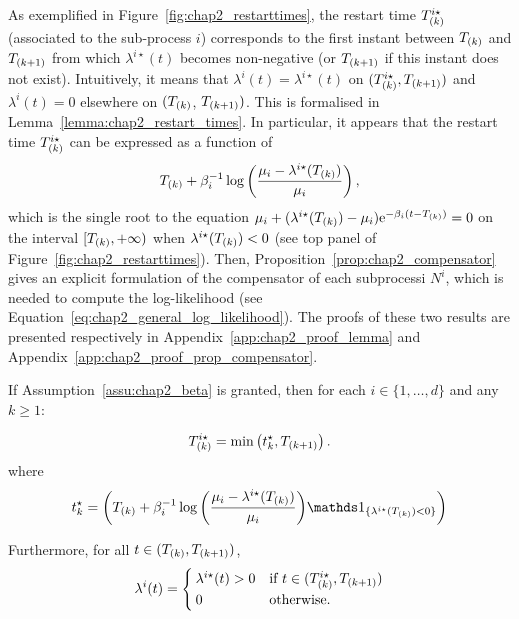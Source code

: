      As exemplified in Figure~\ref{fig:chap2_restarttimes}, the restart time $T\park^{i\star}$ (associated to the sub-process $i$) corresponds to the first instant between $T\park$ and $T\park[k+1]$ from which $\lambda^{i\star}(t)$ becomes non-negative (or $T\park[k+1]$ if this instant does not exist).
    Intuitively, it means that $\lambda^{i}(t) = \lambda^{i\star}(t)$ on $(T\park^{i\star}, T\park[k+1])$ and $\lambda^{i}(t) = 0$ elsewhere on  $(T\park$, $T\park[k+1])$.
    This is formalised in Lemma~\ref{lemma:chap2_restart_times}.
    In particular, it appears that the restart time $T\park^{i\star}$ can be expressed as a function of $$T\park + \beta_i^{-1}\log{\adaptedpar{\frac{\mu_i - \lambda^{i\star}(T\park)}{\mu_i}}}\,,$$
      which is the single root to the equation $\mu_i + (\lambda^{i\star}(T\park) - \mu_i)\mathrm{e}^{-\beta_i(t-T\park)} = 0$ on the interval $[T\park, +\infty)$ when $\lambda^{i\star}(T\park) < 0$ (see top panel of Figure~\ref{fig:chap2_restarttimes}).
      Then, Proposition~\ref{prop:chap2_compensator} gives an explicit formulation of the compensator of each subprocessi \(N^i\), which is needed to compute the log-likelihood (see Equation~\eqref{eq:chap2_general_log_likelihood}).
      The proofs of these two results are presented respectively in Appendix~\ref{app:chap2_proof_lemma} and Appendix~\ref{app:chap2_proof_prop_compensator}.

    \begin{lemma}\label{lemma:chap2_restart_times}
    If Assumption~\ref{assu:chap2_beta} is granted, then for each $i\in\{1,\ldots, d\}$ and any $k\geq1$: 

    \begin{equation}\label{eq:chap2_restart_times_exponential}
        T\park^{i\star} = \min{\adaptedpar{t^\star_k, T\park[k+1]}}\,.
    \end{equation}
    where
    \[t^\star_k = \adaptedpar{T\park + \beta_i^{-1}\log{\adaptedpar{\frac{\mu_i - \lambda^{i\star}(T\park)}{\mu_i}}}\II_{\{\lambda^{i\star}(T\park) < 0\}}}\]

    Furthermore,
    for all \(t \in (T\park, T\park[k+1])\),
    \[
      \lambda^i(t) =
      \begin{cases}
        \lambda^{i\star}(t) > 0 & \text{if } t \in (T\park^{i\star}, T\park[k+1])\\
        0 & \text{otherwise}.
      \end{cases}
    \]
    \end{lemma}

